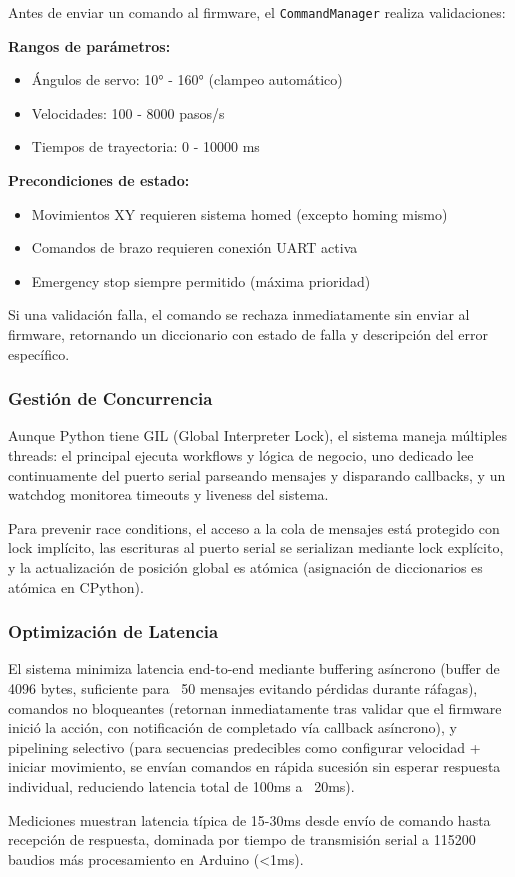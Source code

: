 Antes de enviar un comando al firmware, el \texttt{CommandManager} realiza validaciones:

\textbf{Rangos de parámetros:}
\begin{itemize}
    \item Ángulos de servo: 10° - 160° (clampeo automático)
    \item Velocidades: 100 - 8000 pasos/s
    \item Tiempos de trayectoria: 0 - 10000 ms
\end{itemize}

\textbf{Precondiciones de estado:}
\begin{itemize}
    \item Movimientos XY requieren sistema homed (excepto homing mismo)
    \item Comandos de brazo requieren conexión UART activa
    \item Emergency stop siempre permitido (máxima prioridad)
\end{itemize}

Si una validación falla, el comando se rechaza inmediatamente sin enviar al firmware, retornando un diccionario con estado de falla y descripción del error específico.

\subsubsection{Gestión de Concurrencia}

Aunque Python tiene GIL (Global Interpreter Lock), el sistema maneja múltiples threads: el principal ejecuta workflows y lógica de negocio, uno dedicado lee continuamente del puerto serial parseando mensajes y disparando callbacks, y un watchdog monitorea timeouts y liveness del sistema.

Para prevenir race conditions, el acceso a la cola de mensajes está protegido con lock implícito, las escrituras al puerto serial se serializan mediante lock explícito, y la actualización de posición global es atómica (asignación de diccionarios es atómica en CPython).

\subsubsection{Optimización de Latencia}

El sistema minimiza latencia end-to-end mediante buffering asíncrono (buffer de 4096 bytes, suficiente para ~50 mensajes evitando pérdidas durante ráfagas), comandos no bloqueantes (retornan inmediatamente tras validar que el firmware inició la acción, con notificación de completado vía callback asíncrono), y pipelining selectivo (para secuencias predecibles como configurar velocidad + iniciar movimiento, se envían comandos en rápida sucesión sin esperar respuesta individual, reduciendo latencia total de 100ms a ~20ms).

Mediciones muestran latencia típica de 15-30ms desde envío de comando hasta recepción de respuesta, dominada por tiempo de transmisión serial a 115200 baudios más procesamiento en Arduino (<1ms).
